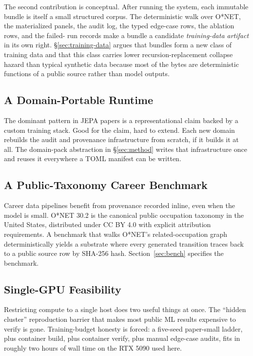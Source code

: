 \documentclass[10pt,twocolumn,letterpaper]{article}
\begin{document}
The second contribution is conceptual. After running the system,
each immutable bundle is itself a small structured corpus. The
deterministic walk over O*NET, the materialized panels, the audit
log, the typed edge-case rows, the ablation rows, and the failed-
run records make a bundle a candidate \emph{training-data artifact}
in its own right. \S\ref{sec:training-data} argues that bundles
form a new class of training data and that this class carries lower
recursion-replacement collapse hazard \cite{shumailov2024nature}
than typical synthetic data because most of the bytes are
deterministic functions of a public source rather than model
outputs.

\subsection{A Domain-Portable Runtime}

The dominant pattern in JEPA papers is a representational claim
backed by a custom training stack. Good for the claim, hard to
extend. Each new domain rebuilds the audit and provenance
infrastructure from scratch, if it builds it at all. The
domain-pack abstraction in \S\ref{sec:method} writes that
infrastructure once and reuses it everywhere a TOML manifest can
be written.

\subsection{A Public-Taxonomy Career Benchmark}

Career data pipelines benefit from provenance recorded inline, even
when the model is small. O*NET 30.2 is the canonical public
occupation taxonomy in the United States, distributed under CC BY
4.0 with explicit attribution requirements. A benchmark that walks
O*NET's related-occupation graph deterministically yields a
substrate where every generated transition traces back to a public
source row by SHA-256 hash. Section~\ref{sec:bench} specifies the
benchmark.

\subsection{Single-GPU Feasibility}

Restricting compute to a single host does two useful things at
once. The ``hidden cluster'' reproduction barrier that makes most
public ML results expensive to verify is gone. Training-budget
honesty is forced: a five-seed paper-small ladder, plus container
build, plus container verify, plus manual edge-case audits, fits in
roughly two hours of wall time on the RTX 5090 used here.
\end{document}
